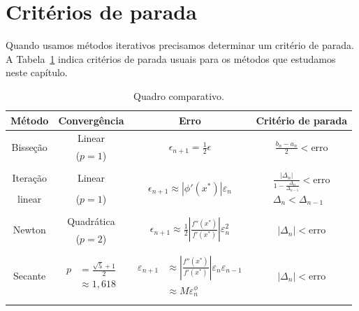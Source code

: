 \section{Critérios de parada}

Quando usamos métodos iterativos precisamos determinar um critério de parada. A Tabela~\ref{tab:quadro_comparativo} indica critérios de parada usuais para os métodos que estudamos neste capítulo.

\begin{table}[h!]
  \centering
  \caption{Quadro comparativo.}
  \label{tab:quadro_comparativo}
  {\small
  \begin{tabular}[h!]{cccc} \hline
    Método & Convergência & Erro & Critério de parada \\ \hline
    \multirow{2}{*}{Bisseção} & Linear & \multirow{2}{*}{$\displaystyle \epsilon_{n+1}=\frac{1}{2}\epsilon$} & \multirow{2}{*}{$\displaystyle \frac{b_n - a_n}{2} < \text{erro}$} \\
    & ($p=1$) & & \\
    & & & \\
    Iteração & Linear & \multirow{2}{*}{$\displaystyle \epsilon_{n+1}\approx |\phi'(x^*)| \varepsilon_{n}$} & \multirow{2}{*}{$\displaystyle \begin{array}{cc} \frac{|\Delta_n|}{1-\frac{\Delta_n}{\Delta_{n-1}}}< \text{erro} \\ \Delta_{n} < \Delta_{n-1}\end{array}$} \\
    linear                 & ($p=1$) & & \\
    & & & \\
    \multirow{2}{*}{Newton} & Quadrática & \multirow{2}{*}{$\displaystyle \epsilon_{n+1}\approx \frac{1}{2}\left|\frac{f''(x^*)}{f'(x^*)}\right|\varepsilon_{n}^2$} & \multirow{2}{*}{$|\Delta_n|< \text{erro}$} \\
    & ($p=2$) & & \\
    & & & \\
    \multirow{3}{*}{Secante} & \multirow{3}{*}{$\displaystyle \begin{array}{rl} p &= {\displaystyle \frac{\sqrt{5}+1}{2}}\\
  &\approx 1,618\end{array}$} & \multirow{3}{*}{$\displaystyle \begin{array}{rl} \varepsilon_{n+1} &\approx \displaystyle \left|\frac{f''(x^*)}{f'(x^*)}\right| \varepsilon_{n}\varepsilon_{n-1} \\
    &\approx M \varepsilon_{n}^\phi\end{array}$} & \multirow{3}{*}{$|\Delta_n|< \text{erro}$}\\
    & & & \\
    & & & \\
    & & & \\ \hline
  \end{tabular}
}
\end{table}


